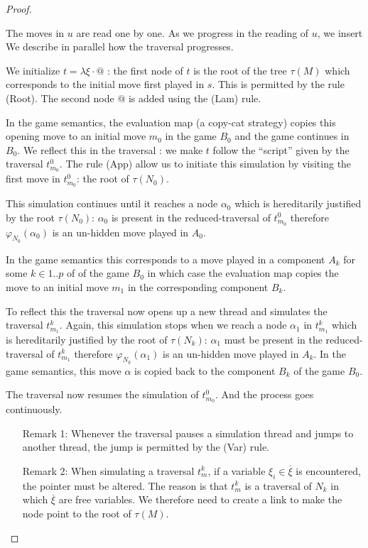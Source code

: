 \begin{proof}
\begin{itemize}
    The moves in $u$ are read one by one. As we progress in the reading of $u$, we insert
 We describe in parallel how the traversal progresses.


    We initialize $t = \lambda \xi \cdot @$ : the first node of $t$ is the
    root of the tree $\tau(M)$ which corresponds to the initial move
    first played in $s$. This is permitted by the rule (Root). The
    second node $@$ is added using the (Lam) rule.

    In the game semantics, the evaluation map (a copy-cat strategy) copies this opening move to an initial move $m_0$ in the game
    $B_0$ and the game continues in $B_0$. We reflect this in the traversal : we make $t$ follow
    the ``script'' given by the traversal $t^0_{m_0}$.
    The rule (App) allow us to initiate this simulation
    by visiting the  first move in $t^0_{m_0}$: the root of $\tau(N_0)$.

    This simulation continues until it reaches a node $\alpha_0$ which is hereditarily justified by the root
    $\tau(N_0)$: $\alpha_0$ is present in the
    reduced-traversal of $t^0_{m_0}$ therefore $\varphi_{N_0}(\alpha_0)$ is an un-hidden move played in $A_0$.

    In the game semantics this corresponds to a move played in a component $A_k$ for some $k\in 1..p$ of
    of the game $B_0$ in which case the evaluation map copies the move to an initial move $m_1$ in the corresponding component $B_k$.

    To reflect this the traversal now opens up a new thread and
    simulates the traversal $t^k_{m_1}$.
    Again, this simulation stops when we reach a node
    $\alpha_1$ in $t^k_{m_1}$ which is hereditarily justified by the root of
    $\tau(N_k)$: $\alpha_1$ must be present in the reduced-traversal
    of $t^k_{m_1}$ therefore $\varphi_{N_k}(\alpha_1)$ is an un-hidden move played in $A_k$.
    In the game semantics, this move $\alpha$ is copied
    back to the component $B_k$ of the game $B_0$.

    The traversal now resumes the simulation of $t^0_{m_0}$. And the
    process goes continuously.

    \begin{itemize}
    \item[Remark 1:] Whenever the traversal pauses a simulation thread and
    jumps to another thread, the jump
    is permitted by the (Var) rule.

    \item[Remark 2:] When simulating a traversal $t^k_{m}$, if a variable
     $\xi_i \in \overline{\xi}$ is encountered, the pointer must be
     altered. The reason is that $t^k_{m}$ is a traversal of $N_k$ in which $\overline{\xi}$ are free
     variables. We therefore need to create a link to make the node point to the root of $\tau(M)$.


\end{itemize}
\end{itemize}
\end{proof}
